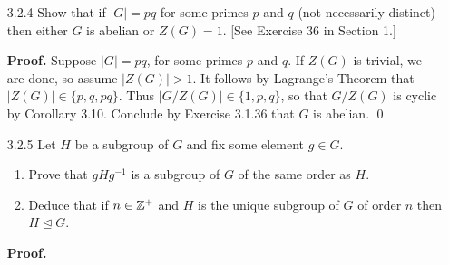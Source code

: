 \begin{enumerate}
      \textbf{Proof.} Let $H$ be a nontrivial proper subgroup of $Q_8$. By
      Langrange's Theorem, $|H| = 2$ or $|H| = 4$. Since $-1$ is the only
      element of order 2 in $Q_8$, it follows that if $|H| = 2$, then $H$ must
      be the subgroup $\cyc{-1}$. Now suppose $|H| = 4$. Let
      $x \in S = \{i, j, k\}$. Then $x \in H$ or $-x \in H$ if and only if
      $H = \cyc{x} = \cyc{-x}$. Thus $H \in \{\cyc{i}, \cyc{j}, \cyc{k}\}$. So
      the intersection of any two subgroups of order 4 in $Q_8$ is $\cyc{-1}$.
      Observe that any subgroup that contains two elements of $S$ must generate 
      $Q_8$ because $Q_8 = \cyc{i, j} = \cyc{j, k} = \cyc{i, k}$. Thus the join
      of any two subgroups of order 4 in $Q_8$ is $Q_8$. Conclude that the 
      lattice of $Q_8$ is correct. \qed
   \item[3.2.4]   Show that if $|G| = pq$ for some primes $p$ and $q$ (not
                  necessarily distinct) then either $G$ is abelian or
                  $Z(G) = 1$. [See Exercise 36 in Section 1.]

      \textbf{Proof.} Suppose $|G| = pq$, for some primes $p$ and $q$. If
      $Z(G)$ is trivial, we are done, so assume $|Z(G)| > 1$. It follows by 
      Lagrange's Theorem that $|Z(G)| \in \{p, q, pq\}$. Thus
      $|G/Z(G)| \in \{1, p, q\}$, so that $G/Z(G)$ is cyclic by Corollary 3.10.
      Conclude by Exercise 3.1.36 that $G$ is abelian. \qed
   \item[3.2.5]   Let $H$ be a subgroup of $G$ and fix some element $g \in G$.
                  \begin{enumerate}
                     \item Prove that $gHg^{-1}$ is a subgroup of $G$ of the
                           same order as $H$.
                     \item Deduce that if $n \in \mathbb{Z}^+$ and $H$ is the unique
                           subgroup of $G$ of order $n$ then
                           $H \trianglelefteq G$.
                  \end{enumerate}
                  
      \textbf{Proof.}
      

\end{enumerate}
